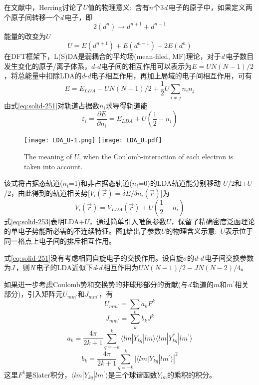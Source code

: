 在文献中，\textrm{Herring}讨论了$U$值的物理意义:~含有$n$个3{\textit d}\,电子的原子中，如果定义两个原子间转移一个{\textit d}\,电子，即
$$2(d^n)\rightarrow d^{n+1}+d^{n-1}$$
能量的改变为$U$
$$U=E(d^{n+1})+E(d^{n-1})-2E(d^n)$$
在\textrm{DFT}框架下，\textrm{L(S)DA}是弱耦合的平均场(\textrm{mean-filed, MF})理论，对于{\textit d}\,电子数目发生变化的原子/离子体系，$d$-$d$电子间的相互作用可以表示为$E=UN(N-1)/2$\cite{PRB48-16929_1993}，将总能量中扣除LDA的$d$-$d$电子相互作用，再加上局域的电子间相互作用，可有
\begin{equation}
  E=E_{LDA}-UN(N-1)/2+\frac12U\sum_{i\neq j}n_in_j
  \label{eq:solid-251}
\end{equation}
由式\eqref{eq:solid-251}对轨道占据数$n_i$求导得轨道能
\begin{equation}
  \varepsilon_i=\frac{\partial E}{\partial n_i}=E_{LDA}+U(\frac12-n_i)
  \label{eq:solid-252}
\end{equation}
\begin{figure}[h!]
\centering
\texttt{[image: LDA\_U-1.png]}
\texttt{[image: LDA\_U.pdf]}
\caption{\small \textrm{The meaning of $U$, when the Coulomb-interaction of each electron is taken into account.}}%
\label{U_means}
\end{figure}
该式将占据态轨道($n_i$=1)和非占据态轨道($n_i$=0)的LDA轨道能分别移动-$U$/2和+$U$/2，由此得到的轨道相关势[$V_i(\vec r)=\delta E/\delta n_i(\vec r)$]为
\begin{equation}
  V_i(\vec r)=V_{LDA}(\vec r)+U(\frac12-n_i)
  \label{eq:solid-253}
\end{equation}
式\eqref{eq:solid-253}表明\textrm{LDA}+$U$，通过简单引入唯象参数$U$，保留了精确密度泛函理论的单电子势能所必需的不连续特征。图\ref{U_means}给出了参数$U$的物理含义示意:~$U$表示位于同一格点上电子间的排斥相互作用。

式\eqref{eq:solid-251}没有考虑相同自旋电子的交换作用。设自旋$\sigma$的{\textit d}-{\textit d}\,电子间交换参数为{\textit J}\,，则{\textit N}\,电子的LDA近似下{\textit d}-{\textit d}\,相互作用为$UN(N-1)/2-JN(N-2)/4$。

如果进一步考虑Coulomb势和交换势的非球形部分的贡献(与{\textit d}\,轨道的$m$和$m^{\prime}$相关部分)，引入矩阵元$U_{mm^{\prime}}$和$J_{mm^{\prime}}$，有
\begin{equation}
  U_{mm^{\prime}}=\sum_ka_kF^k
  \label{eq:solid-210}
\end{equation}
\begin{equation}
  J_{mm^{\prime}}=\sum_kb_kJ^k
  \label{eq:solid-211}
\end{equation}
\begin{equation}
  a_k=\frac{4\pi}{2k+1}\sum_{q=-k}^k\langle lm|Y_{kq}|lm\rangle\langle lm|Y_{kq}^{\ast}|lm^{\prime}\rangle
  \label{eq:solid-212}
\end{equation}
\begin{equation}
  b_k=\frac{4\pi}{2k+1}\sum_{q=-k}^k|\langle lm|Y_{kq}|lm^{\prime}\rangle|^2
  \label{eq:solid-213}
\end{equation}
这里$F^k$是Slater积分，$\langle lm|Y_{kq}|lm^{\prime}\rangle$是三个球谐函数$Y_{lm}$的乘积的积分。

